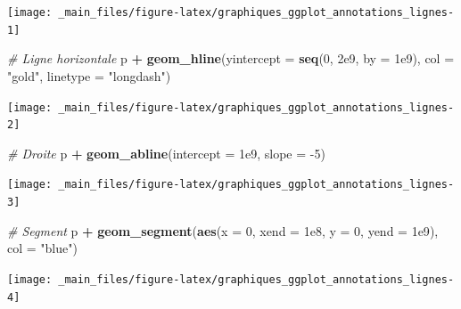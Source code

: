 \documentclass[
  11pt,
]{book}
\newenvironment{Shaded}{\begin{snugshade}}{\end{snugshade}}
\newcommand{\CommentTok}[1]{\textcolor[rgb]{0.56,0.35,0.01}{\textit{#1}}}
\newcommand{\DataTypeTok}[1]{\textcolor[rgb]{0.13,0.29,0.53}{#1}}
\newcommand{\DecValTok}[1]{\textcolor[rgb]{0.00,0.00,0.81}{#1}}
\newcommand{\FloatTok}[1]{\textcolor[rgb]{0.00,0.00,0.81}{#1}}
\newcommand{\KeywordTok}[1]{\textcolor[rgb]{0.13,0.29,0.53}{\textbf{#1}}}
\newcommand{\NormalTok}[1]{#1}
\newcommand{\OperatorTok}[1]{\textcolor[rgb]{0.81,0.36,0.00}{\textbf{#1}}}
\newcommand{\StringTok}[1]{\textcolor[rgb]{0.31,0.60,0.02}{#1}}
\numberwithin{equation}{section}
\numberwithin{countremarque}{section}
\begin{document}
\begin{center}\texttt{[image: \_main\_files/figure-latex/graphiques\_ggplot\_annotations\_lignes-1]} \end{center}

\begin{Shaded}
\begin{Highlighting}[]
\CommentTok{\# Ligne horizontale}
\NormalTok{p }\OperatorTok{+}\StringTok{ }\KeywordTok{geom\_hline}\NormalTok{(}\DataTypeTok{yintercept =} \KeywordTok{seq}\NormalTok{(}\DecValTok{0}\NormalTok{, }\FloatTok{2e9}\NormalTok{, }\DataTypeTok{by =} \FloatTok{1e9}\NormalTok{),}
               \DataTypeTok{col =} \StringTok{"gold"}\NormalTok{, }\DataTypeTok{linetype =} \StringTok{"longdash"}\NormalTok{)}
\end{Highlighting}
\end{Shaded}

\begin{center}\texttt{[image: \_main\_files/figure-latex/graphiques\_ggplot\_annotations\_lignes-2]} \end{center}

\begin{Shaded}
\begin{Highlighting}[]
\CommentTok{\# Droite}
\NormalTok{p }\OperatorTok{+}\StringTok{ }\KeywordTok{geom\_abline}\NormalTok{(}\DataTypeTok{intercept =} \FloatTok{1e9}\NormalTok{, }\DataTypeTok{slope =} \DecValTok{{-}5}\NormalTok{)}
\end{Highlighting}
\end{Shaded}

\begin{center}\texttt{[image: \_main\_files/figure-latex/graphiques\_ggplot\_annotations\_lignes-3]} \end{center}

\begin{Shaded}
\begin{Highlighting}[]
\CommentTok{\# Segment}
\NormalTok{p }\OperatorTok{+}\StringTok{ }\KeywordTok{geom\_segment}\NormalTok{(}\KeywordTok{aes}\NormalTok{(}\DataTypeTok{x =} \DecValTok{0}\NormalTok{, }\DataTypeTok{xend =} \FloatTok{1e8}\NormalTok{, }
                     \DataTypeTok{y =} \DecValTok{0}\NormalTok{, }\DataTypeTok{yend =} \FloatTok{1e9}\NormalTok{), }\DataTypeTok{col =} \StringTok{"blue"}\NormalTok{)}
\end{Highlighting}
\end{Shaded}

\begin{center}\texttt{[image: \_main\_files/figure-latex/graphiques\_ggplot\_annotations\_lignes-4]} \end{center}
\end{document}
